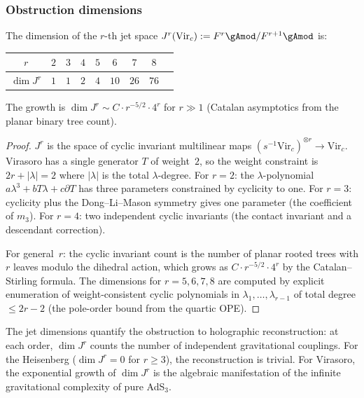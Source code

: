 \subsubsection*{Obstruction dimensions}

\begin{proposition}
\label{prop:gravity-jet-dimensions}
The dimension of the $r$-th jet space
$J^r(\mathrm{Vir}_c)
:= F^r\gAmod / F^{r+1}\gAmod$ is:
\begin{center}
\renewcommand{\arraystretch}{1.15}
\begin{tabular}{c|cccccccc}
$r$ & $2$ & $3$ & $4$ & $5$ & $6$ & $7$ & $8$ \\
\hline
$\dim J^r$ & $1$ & $1$ & $2$ & $4$ & $10$ & $26$ & $76$
\end{tabular}
\end{center}
The growth is $\dim J^r \sim C \cdot r^{-5/2} \cdot 4^r$ for
$r \gg 1$ \textup{(}Catalan asymptotics from the planar binary
tree count\textup{)}.
\end{proposition}

\begin{proof}
$J^r$ is the space of cyclic invariant multilinear maps
$(s^{-1}\mathrm{Vir}_c)^{\otimes r} \to \mathrm{Vir}_c$.
Virasoro has a single generator $T$ of weight~$2$, so the
weight constraint is $2r + |\lambda| = 2$ where $|\lambda|$
is the total $\lambda$-degree. For $r = 2$: the
$\lambda$-polynomial $a\lambda^3 + bT\lambda + c\partial T$
has three parameters constrained by cyclicity to one.
For $r = 3$: cyclicity plus the Dong--Li--Mason symmetry gives
one parameter (the coefficient of $m_3$). For $r = 4$: two
independent cyclic invariants (the contact invariant and a
descendant correction).

For general~$r$: the cyclic invariant count is the number
of planar rooted trees with $r$ leaves
modulo the dihedral action, which grows as
$C \cdot r^{-5/2} \cdot 4^r$ by the Catalan--Stirling formula.
The dimensions for $r = 5,6,7,8$ are computed by explicit
enumeration of weight-consistent cyclic polynomials in
$\lambda_1, \ldots, \lambda_{r-1}$ of total degree
$\le 2r - 2$ (the pole-order bound from the quartic OPE).
\end{proof}

The jet dimensions quantify the obstruction to holographic
reconstruction: at each order, $\dim J^r$ counts the number of
independent gravitational couplings. For the Heisenberg
($\dim J^r = 0$ for $r \ge 3$), the reconstruction is trivial.
For Virasoro, the exponential growth of $\dim J^r$ is the
algebraic manifestation of the infinite gravitational
complexity of pure AdS$_3$.


